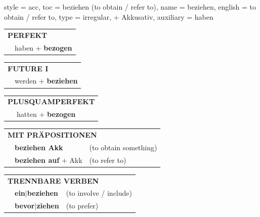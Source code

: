 \begin{verbentry}{
  style = {acc},
  toc = {beziehen (to obtain / refer to)},
  name = {beziehen},
  english = {to obtain / refer to},
  type = {irregular, + Akkusativ},
  auxiliary = {haben}
}
\vspace{10pt}

\begin{tabular}{rl}
\multicolumn{2}{l}{\textbf{PERFEKT}}\\
& haben + \textbf{bezogen}\\
\end{tabular}
\hfill
\begin{tabular}{rl}
\multicolumn{2}{l}{\textbf{FUTURE I}}\\
& werden + \textbf{beziehen}\\
\end{tabular}
\hfill
\begin{tabular}{rl}
\multicolumn{2}{l}{\textbf{PLUSQUAMPERFEKT}}\\
& hatten + \textbf{bezogen}\\
\end{tabular}

\vspace{10pt}

\begin{tabular}{lll}
\multicolumn{3}{l}{\textbf{MIT PRÄPOSITIONEN}}\\
& \textbf{beziehen Akk} & (to obtain something)\\
& \textbf{beziehen auf} + Akk & (to refer to)\\
\end{tabular}
\hfill
\begin{tabular}{lll}
\multicolumn{3}{l}{\textbf{TRENNBARE VERBEN}}\\
& \textbf{ein$|$beziehen} & (to involve / include)\\
& \textbf{bevor$|$ziehen} & (to prefer)\\
\end{tabular}

\vspace{-5pt}
\end{verbentry}

